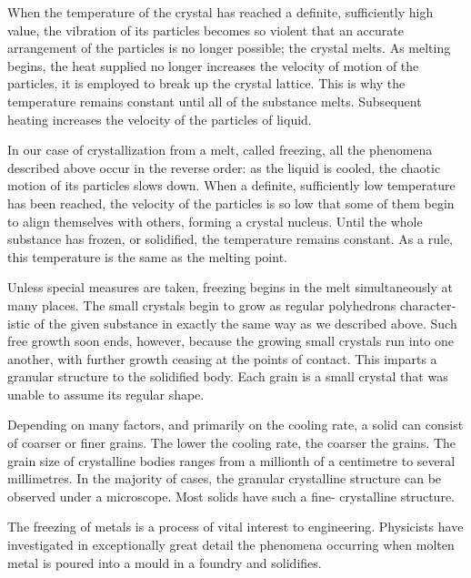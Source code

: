 When the temperature of the crystal has reached a definite, sufficiently high value, the vibration of its particles becomes so violent that an accurate arrangement of the particles is no longer possible; the crystal melts. As melting begins, the heat supplied no longer increases the velocity of motion of the particles, it is employed to break up the crystal lattice. This is why the temperature remains constant until all of the substance melts. Subsequent heating increases the velocity of the particles of liquid.

In our case of crystallization from a melt, called freez­ing, all the phenomena described above occur in the reverse order: as the liquid is cooled, the chaotic motion of its particles slows down. When a definite, sufficiently low temperature has been reached, the velocity of the particles is so low that some of them begin to align themselves with others, forming a crystal nucleus. Until the whole substance has frozen, or solidified, the temperature remains constant. As a rule, this temperature is the same as the melting point.

Unless special measures are taken, freezing begins in the melt simultaneously at many places. The small crystals begin to grow as regular polyhedrons character­istic of the given substance in exactly the same way as we described above. Such free growth soon ends, however, because the growing small crystals run into one another, with further growth ceasing at the points of contact. This imparts a granular structure to the solidified body. Each grain is a small crystal that was unable to assume its regular shape.

Depending on many factors, and primarily on the cooling rate, a solid can consist of coarser or finer grains. The lower the cooling rate, the coarser the grains. The grain size of crystalline bodies ranges from a millionth of a centimetre to several millimetres. In the majority of cases, the granular crystalline structure can be observed under a microscope. Most solids have such a fine- crystalline structure.

The freezing of metals is a process of vital interest to engineering. Physicists have investigated in exceptionally great detail the phenomena occurring when molten metal is poured into a mould in a foundry and solidifies.

